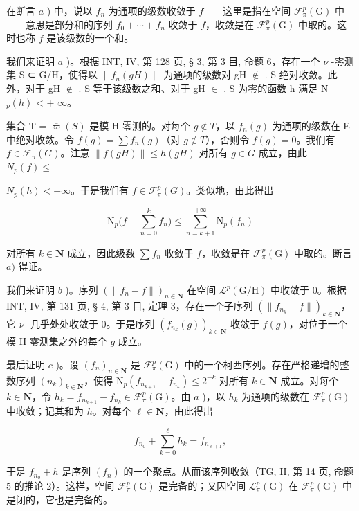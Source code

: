 在断言 \(a\) ) 中，说以 \(f_n\) 为通项的级数收敛于 \(f\)——这里是指在空间 \(\mathcal{F}_{\pi}^{p}(\mathrm{G})\) 中——意思是部分和的序列 \(f_0 + \cdots + f_n\) 收敛于 \(f\)，收敛是在 \(\mathcal{F}_{\pi}^{p}(\mathrm{G})\) 中取的。这时也称 \(f\) 是该级数的一个和。

我们来证明 \(a\) )。根据 INT, IV, 第 128 页, § 3, 第 3 目, 命题 6，存在一个 \(\nu\) -零测集 S ⊂ G/H，使得以 \(\|f_n(gH)\|\) 为通项的级数对 gH \(\notin\) . S 绝对收敛。此外，对于 gH \(\notin\) . S 等于该级数之和、对于 gH \(\in\) . S 为零的函数 h 满足 N \(_p(h)\) \textless{} + \(\infty\)。

集合 T = \(\overline{\varpi}(S)\) 是模 H 零测的。对每个 \(g \notin T\)，以 \(f_{n}(g)\) 为通项的级数在 E 中绝对收敛。令 \(f(g) = \sum f_{n}(g)\)（对 \(g \notin T\)），否则令 \(f(g) = 0\)。我们有 \(f \in \mathcal{F}_{\pi}(G)\)。注意 \(\|f(gH)\| \leqslant h(gH)\) 对所有 \(g \in G\) 成立，由此 \(N_{p}(f) \leqslant\)

\(N_{p}(h) < +\infty\)。于是我们有 \(f \in \mathcal{F}_{\pi}^{p}(G)\)。类似地，由此得出

\[
\mathrm{N} _ {p} \Big (f - \sum_ {n = 0} ^ {k} f _ {n} \Big) \leqslant \sum_ {n = k + 1} ^ {+ \infty} \mathrm{N} _ {p} (f _ {n})
\]

对所有 \(k \in \mathbf{N}\) 成立，因此级数 \(\sum f_n\) 收敛于 \(f\)，收敛是在 \(\mathcal{F}_{\pi}^{p}(\mathrm{G})\) 中取的。断言 \(a)\) 得证。

我们来证明 \(b\) )。序列 \((\|f_n - f\|)_{n \in \mathbf{N}}\) 在空间 \(\mathcal{L}^p(\mathrm{G}/\mathrm{H})\) 中收敛于 0。根据 INT, IV, 第 131 页, § 4, 第 3 目, 定理 3，存在一个子序列 \((\|f_{n_k} - f\|)_{k \in \mathbf{N}}\)，它 \(\nu\) -几乎处处收敛于 0。于是序列 \((f_{n_k}(g))_{k \in \mathbf{N}}\) 收敛于 \(f(g)\)，对位于一个模 H 零测集之外的每个 \(g\) 成立。

最后证明 \(c\) )。设 \((f_n)_{n \in \mathbf{N}}\) 是 \(\mathcal{F}_\pi^p(\mathrm{G})\) 中的一个柯西序列。存在严格递增的整数序列 \((n_k)_{k \in \mathbf{N}}\)，使得 \(\mathrm{N}_p(f_{n_{k+1}} - f_{n_k}) \leqslant 2^{-k}\) 对所有 \(k \in \mathbf{N}\) 成立。对每个 \(k \in \mathbf{N}\)，令 \(h_k = f_{n_{k+1}} - f_{n_k} \in \mathcal{F}_\pi^p(\mathrm{G})\)。由 \(a\) )，以 \(h_k\) 为通项的级数在 \(\mathcal{F}_\pi^p(\mathrm{G})\) 中收敛；记其和为 \(h\)。对每个 \(\ell \in \mathbf{N}\)，由此得出

\[
f _ {n _ {0}} + \sum_ {k = 0} ^ {\ell} h _ {k} = f _ {n _ {\ell + 1}},
\]

于是 \(f_{n_{0}} + h\) 是序列 \((f_{n})\) 的一个聚点。从而该序列收敛（TG, II, 第 14 页, 命题 5 的推论 2）。这样，空间 \(\mathcal{F}_{\pi}^{p}(\mathrm{G})\) 是完备的；又因空间 \(\mathcal{L}_{\pi}^{p}(\mathrm{G})\) 在 \(\mathcal{F}_{\pi}^{p}(\mathrm{G})\) 中是闭的，它也是完备的。

